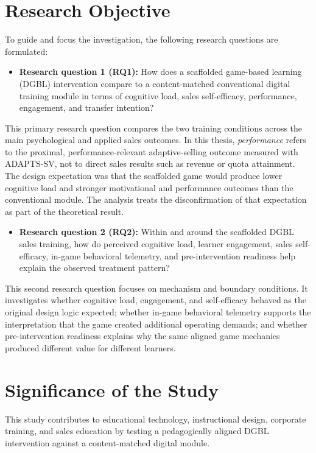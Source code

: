 \documentclass[12pt]{report}
\begin{document}
\section{Research Objective}
To guide and focus the investigation, the following research questions are formulated:

\begin{itemize}[leftmargin=1.2cm]
    \item \textbf{Research question 1 (RQ1):} How does a scaffolded game-based learning (DGBL) intervention compare to a content-matched conventional digital training module in terms of cognitive load, sales self-efficacy, performance, engagement, and transfer intention?
\end{itemize}

This primary research question compares the two training conditions across the main psychological and applied sales outcomes. In this thesis, \textit{performance} refers to the proximal, performance-relevant adaptive-selling outcome measured with ADAPTS-SV, not to direct sales results such as revenue or quota attainment. The design expectation was that the scaffolded game would produce lower cognitive load and stronger motivational and performance outcomes than the conventional module. The analysis treats the disconfirmation of that expectation as part of the theoretical result.

\begin{itemize}[leftmargin=1.2cm]
    \item \textbf{Research question 2 (RQ2):} Within and around the scaffolded DGBL sales training, how do perceived cognitive load, learner engagement, sales self-efficacy, in-game behavioral telemetry, and pre-intervention readiness help explain the observed treatment pattern?
\end{itemize}

This second research question focuses on mechanism and boundary conditions. It investigates whether cognitive load, engagement, and self-efficacy behaved as the original design logic expected; whether in-game behavioral telemetry supports the interpretation that the game created additional operating demands; and whether pre-intervention readiness explains why the same aligned game mechanics produced different value for different learners.

\section{Significance of the Study}
This study contributes to educational technology, instructional design, corporate training, and sales education by testing a pedagogically aligned DGBL intervention against a content-matched digital module.
\end{document}
